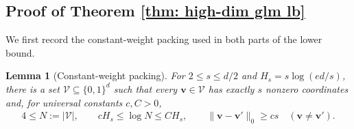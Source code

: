 \documentclass[letterpaper,12pt]{article}
\numberwithin{equation}{section}
\theoremstyle{plain}
\numberwithin{Theorem}{section}
\numberwithin{proposition}{section}
\newtheorem{Lemma}{Lemma}
\numberwithin{Lemma}{section}
{
	\theoremstyle{definition}
	\newtheorem{Definition}{Definition}
	\newtheorem{example}{Example}
	\numberwithin{example}{section}
	\newtheorem{fact}{Fact}
	\numberwithin{fact}{section}
	\newtheorem{remark}{Remark}
}
\newcommand{\1}{\mathbbm{1}}
\begin{document}
\subsection{Proof of Theorem \ref{thm: high-dim glm lb}}\label{sec: proof of thm: high-dim glm lb}

We first record the constant-weight packing used in both parts of the
lower bound.

\begin{Lemma}[Constant-weight packing]\label{lm: sparse constant weight packing}
For $2\leq s\leq d/2$ and $H_s=s\log(ed/s)$, there is a set
$\mathcal V\subseteq\{0,1\}^d$ such that every $\bm v\in\mathcal V$
has exactly $s$ nonzero coordinates and, for universal constants
$c,C>0$,
\begin{align}
    4\leq N:=|\mathcal V|,\qquad
    cH_s\leq\log N\leq CH_s,\qquad
    \|\bm v-\bm v'\|_0\geq cs
    \quad(\bm v\neq\bm v').                               \label{eq: sparse packing lemma conclusion}
\end{align}
\end{Lemma}
\end{document}
